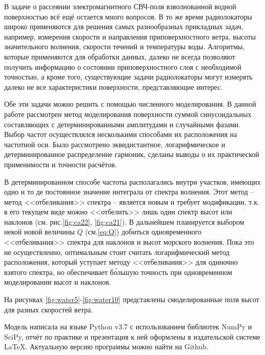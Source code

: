В задаче о рассеянии электромагнитного СВЧ-поля взволнованной водной поверхностью всё ещё остается много вопросов. В то же время радиолокаторы широко применяются для решения самых разнообразных прикладных задач, например, измерения скорости и направления приповерхностного ветра, высоты значительного волнения, скорости течений и температуры воды. Алгоритмы, которые применяются для обработки данных, далеко не всегда позволяют получить информацию о состоянии приповерхностного слоя с необходимой точностью, а кроме того, существующие задачи радиолокаторы могут измерять далеко не все характеристики поверхности, представляющие интерес.

Обе эти задачи можно решить с помощью численного моделирования. В данной работе рассмотрен метод моделирования поверхности суммой синусоидальных составляющих с детерминированными амплитудами и случайными фазами. Выбор частот осуществлялся несколькими способами их расположения на частотной оси. 
Было рассмотрено эквидистантное, логарифмическое и детерминированное  распределение гармоник, сделаны выводы о их практической применимости и точности расчётов.

В детерминированном способе частоты располагались внутри участков, имеющих одно и то де постоянное значение интеграла от спектра волнения. Этот метод -- метод <<отбеливания>> спектра -- является новым и требует модификации, т.к. в его текущем виде можно <<отбелить>> лишь один спектр высот или наклонов (см. рис.\ref{fig:ca22}, \ref{fig:ca21}). В дальнейшем планируется выбором некой новой величины $Q$ (см.\eqref{eq:Q}) добиться одновременного <<отбеливания>> спектра для наклонов и высот морского волнения. Пока это не осуществленно, оптимальным стоит считать логарифмический метод расположения, который уступает методу <<отбеливания>> для одиночно взятого спектра, но обеспечивает б\'{о}льшую точность при одновременном моделировании высот и наклонов. 



На рисунках \ref{fig:water5}-\ref{fig:water10} представлены 
смоделированные  поля высот для разных скоростей ветра.

{Модель написала на языке Python v3.7 с использованием библиотек NumPy и SciPy, отчёт по практике и презентация к ней оформлены в издательской системе \LaTeX. Актуальную версию программы можно найти на 
Github.
\vfill
\begin{center}
\end{center}}

% 


